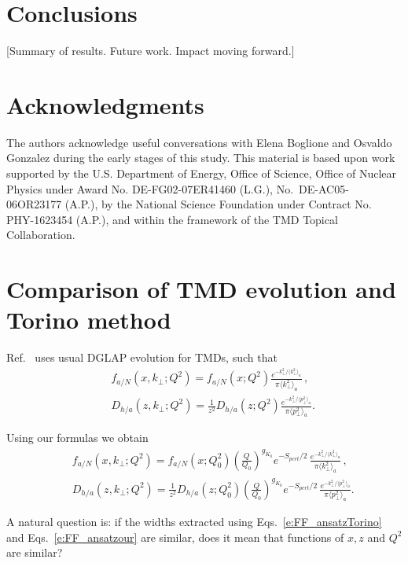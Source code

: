 \documentclass[final,3p,times,onecolumn,sort&compress,hidelinks]{elsarticle}
\begin{document}
\section{Conclusions}
\label{s:concl}
[Summary of results.  Future work.  Impact moving forward.]



 
\section*{Acknowledgments}
The authors acknowledge useful conversations with Elena Boglione and Osvaldo Gonzalez during the early stages of this study.
 This material is based upon work supported by the
U.S. Department of Energy, Office of Science, Office of Nuclear
Physics under Award No. DE-FG02-07ER41460 (L.G.), No.~DE-AC05-06OR23177 (A.P.), by the National Science Foundation 
under Contract No. PHY-1623454 (A.P.), and within the 
framework of the TMD Topical Collaboration.


\appendix
\section{Comparison of TMD evolution and Torino method}
\label{appendix}

Ref.~\cite{Anselmino:2013lza} uses usual DGLAP evolution for TMDs, such that
\begin{eqnarray}
&&f_{a/N} (x,k_\perp; Q^2)= f_{a/N} (x; Q^2) \frac{e^{-k_\perp^2/{\langle k_\perp^2 \rangle_a}}}{\pi \langle k_\perp^2 \rangle_a}\,,
\nonumber \\[0.3cm]
&&D_{h/a}(z,k_\perp; Q^2) =  \frac{1}{z^2} D_{h/a}(z; Q^2) \frac{e^{-k_\perp^2/{\langle p_\perp^2 \rangle_a}}}{\pi \langle p_\perp^2 \rangle_a}.
\label{e:FF_ansatzTorino}
\end{eqnarray}

Using our formulas we obtain
\begin{eqnarray}
&&f_{a/N} (x,k_\perp; Q^2)= f_{a/N} (x; Q_0^2) \left( \frac{Q}{Q_0}\right)^{g_{K_0}}e^{-S_{pert}/2}\,\frac{e^{-k_\perp^2/{\langle k_\perp^2 \rangle_a}}} {\pi \langle k_\perp^2 \rangle_a}\, ,
\nonumber \\[0.3cm]
&&D_{h/a}(z,k_\perp; Q^2) =  \frac{1}{z^2} D_{h/a}(z; Q_0^2)  \left( \frac{Q}{Q_0}\right)^{g_{K_0}}e^{-S_{pert}/2}\,  \frac{e^{-k_\perp^2/{\langle p_\perp^2 \rangle_a}}}{\pi \langle p_\perp^2 \rangle_a}.
\label{e:FF_ansatzour}
\end{eqnarray}

A natural question is: if the widths extracted using Eqs.~\eqref{e:FF_ansatzTorino} and Eqs.~\eqref{e:FF_ansatzour} are similar, does it mean that functions of $x,z$ and $Q^2$ are similar?
\end{document}
